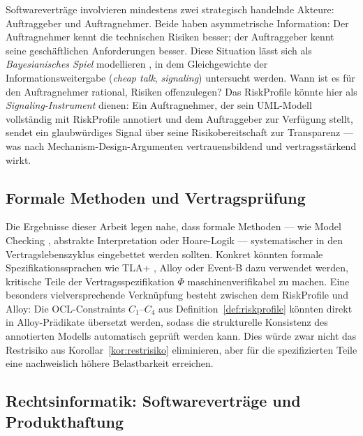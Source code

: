 ﻿\documentclass[a4paper,12pt]{article}
\theoremstyle{definition}
\begin{document}
Softwarevertr\"age involvieren mindestens zwei strategisch handelnde Akteure: Auftraggeber
und Auftragnehmer. Beide haben asymmetrische Information: Der Auftragnehmer kennt die
technischen Risiken besser; der Auftraggeber kennt seine gesch\"aftlichen Anforderungen
besser. Diese Situation l\"asst sich als \emph{Bayesianisches Spiel} modellieren
\cite{harsanyi1967}, in dem Gleichgewichte der Informationsweitergabe (\emph{cheap talk},
\emph{signaling}) untersucht werden. Wann ist es f\"ur den Auftragnehmer rational, Risiken
offenzulegen? Das \textsf{RiskProfile} k\"onnte hier als \emph{Signaling-Instrument}
dienen: Ein Auftragnehmer, der sein UML-Modell vollst\"andig mit \textsf{RiskProfile}
annotiert und dem Auftraggeber zur Verf\"ugung stellt, sendet ein glaubw\"urdiges Signal
\"uber seine Risikobereitschaft zur Transparenz --- was nach Mechanism-Design-Argumenten
\cite{harsanyi1967} vertrauensbildend und vertragsst\"arkend wirkt.

\subsection{Formale Methoden und Vertragsprüfung}

Die Ergebnisse dieser Arbeit legen nahe, dass formale Methoden --- wie Model Checking
\cite{clarke1999}, abstrakte Interpretation \cite{cousot1977} oder Hoare-Logik
\cite{hoare1969} --- systematischer in den Vertragslebenszyklus eingebettet werden
sollten. Konkret k\"onnten formale Spezifikationssprachen wie TLA+ \cite{lamport2002},
Alloy oder Event-B dazu verwendet werden, kritische Teile der Vertragsspezifikation
$\Phi$ maschinenverifikabel zu machen. Eine besonders vielversprechende Verkn\"upfung
besteht zwischen dem \textsf{RiskProfile} und Alloy: Die OCL-Constraints
$C_1$--$C_4$ aus Definition~\ref{def:riskprofile} k\"onnten direkt in Alloy-Pr\"adikate
\"ubersetzt werden, sodass die strukturelle Konsistenz des annotierten Modells automatisch
gepr\"uft werden kann. Dies w\"urde zwar nicht das Restrisiko aus Korollar~\ref{kor:restrisiko}
eliminieren, aber f\"ur die spezifizierten Teile eine nachweislich h\"ohere Belastbarkeit
erreichen.

\subsection{Rechtsinformatik: Softwarevertr\"age und Produkthaftung}
\end{document}
